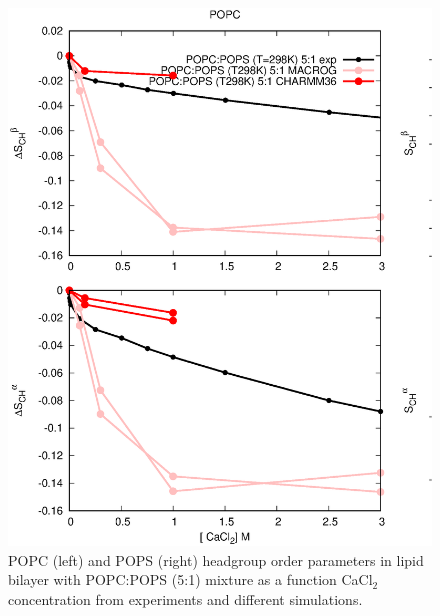 \documentclass[aps,prl,superscriptaddress,twocolumn]{revtex4}
\begin{document}
\begin{figure}[]
  \centering
  \includegraphics[width=18cm]{../Figs/CHANGESwithCaClPS.eps}
  \caption{\label{changesWITHCaClPS}
    POPC (left) and POPS (right) headgroup order parameters in lipid bilayer with POPC:POPS (5:1) mixture
    as a function CaCl$_2$ concentration from experiments \cite{roux90} and different simulations.
  }
\end{figure}
\end{document}

